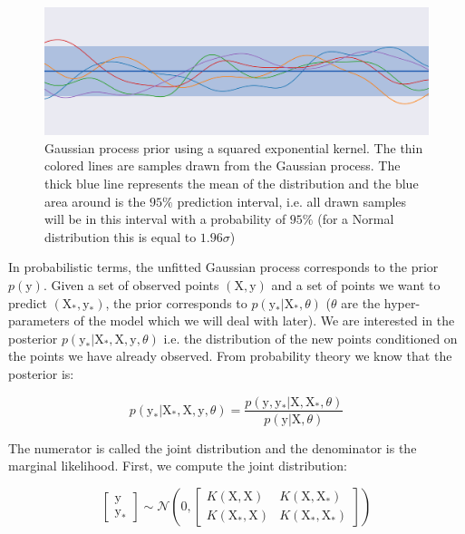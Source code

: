 \begin{figure}[htb]
	\centering
	\includegraphics[width=\linewidth]{img_hyperopt/gp_prior.png}
	\caption{Gaussian process prior using a squared exponential kernel. The thin colored lines are samples drawn from the Gaussian process. The thick blue line represents the mean of the distribution and the blue area around is the $95 \%$ prediction interval, i.e. all drawn samples will be in this interval with a probability of $95 \%$ (for a Normal distribution this is equal to $1.96 \sigma$)}
	\label{fig:gp_prior}
\end{figure}

In probabilistic terms, the unfitted Gaussian process corresponds to the prior $p \left( \mathrm{y} \right)$. Given a set of observed points $(\mathrm{X}, \mathrm{y})$ and a set of points we want to predict $(\mathrm{X_*}, \mathrm{y_*})$, the prior corresponds to $p\left( \mathrm{y_*} | \mathrm{X_*}, \theta \right)$ ($\theta$ are the hyper-parameters of the model which we will deal with later). We are interested in the posterior $p\left( \mathrm{y_*} | \mathrm{X_*}, \mathrm{X}, \mathrm{y}, \theta \right)$ i.e. the distribution of the new points conditioned on the points we have already observed. From probability theory we know that the posterior is:

\begin{equation}
    p\left( \mathrm{y_*} | \mathrm{X_*}, \mathrm{X}, \mathrm{y}, \theta \right)
    =
    \frac{p\left( \mathrm{y}, \mathrm{y_*} | \mathrm{X}, \mathrm{X_*}, \theta \right)}{p\left( \mathrm{y} | \mathrm{X}, \theta \right)}
\end{equation}

The numerator is called the joint distribution and the denominator is the marginal likelihood. First, we compute the joint distribution:

\begin{equation}
    \begin{bmatrix}
    \mathrm{y} \\
    \mathrm{y_*}
    \end{bmatrix}
    \sim
    \mathcal{N} \left( 0, 
    \begin{bmatrix}
    K(\mathrm{X}, \mathrm{X}) & K(\mathrm{X}, \mathrm{X_*}) \\
    K(\mathrm{X_*}, \mathrm{X}) & K(\mathrm{X_*}, \mathrm{X_*})
    \end{bmatrix}
    \right)
\end{equation}

